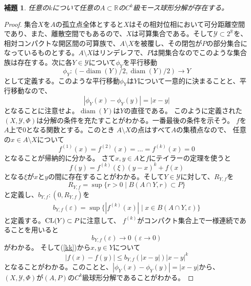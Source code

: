 \documentclass[leqno]{jsarticle}
\newtheorem{lem}[thm]{補題}
\newcommand{\rr}{\mathbb{R}}
\newcommand{\ep}{\varepsilon}
\newcommand{\cl}{\text{{\rm CL}}}
\DeclareMathOperator{\di}{diam}
\begin{document}
\begin{lem}\label{m1}
任意の$k$について任意の$A\subset \rr$の$C^k$級モース球形分解が存在する。
\end{lem}
\begin{proof}
集合$X$を$A$の孤立点全体とすると$X$はその相対位相において可分距離空間であり、また、離散空間でもあるので、$X$は可算集合である。そして$\mathcal{Y}\subset 2^{\rr}$を、相対コンパクトな開区間の可算族で、$A\setminus X$を被覆し、その閉包が$P$の部分集合になっているものとする。$A\setminus X$はリンデレフで、$P$は開集合なのでこのような集合族は存在する。次に各$Y\in \mathcal{Y}$について$\phi_Y$を平行移動
\[
\phi_Y:(-\di(Y)/2, \di(Y)/2)\to Y
\]
として定義する。このような平行移動$\phi_Y$は$Y$について一意的に決まることと、平行移動なので、
\[
|\phi_Y(x)-\phi_Y(y)|=|x-y|
\]
となることに注意せよ。$\di(Y)$は$Y$の直径である。
このように定義された$(X,\mathcal{Y}, \Phi)$は分解の条件を充たすことがわかる。一番最後の条件を示そう。
$f$を$A$上で$0$となる関数とする。このとき
$A\setminus X$の点はすべて$A$の集積点なので、
任意の$x\in A\setminus X$について
\[
f^{(1)}(x)=f^{(2)}(x)=\dots =f^{(k)}(x)=0
\]
となることが帰納的に分かる。
さて$x,y\in A$と$f$にテイラーの定理を使うと
\[
f(y)=f^{(k)}(\xi)(y-x)^k+f(x)
\]
となる$\xi$が$x$と$y$の間に存在することがわかる。そして$Y\in \mathcal{Y}$に対して、$R_{Y,f}$を
\[
R_{Y,f}=\sup\{r>0\mid B(A\cap Y, r)\subset P\}
\]
と定義し、$b_{Y,f}:(0,R_{Y,f})$を
\begin{align}\label{kk}
b_{Y,f}(\ep)=\sup\{|f^{(k)}(x)|\mid x\in B(A\cap Y,\ep)\}
\end{align}
と定義する。$\cl(Y)\subset P$に注意して、
$f^{(k)}$がコンパクト集合上で一様連続であることを用いると
\[
b_{Y,f}(\ep)\to 0 \ (\ep\to 0)
\]がわかる。
そして(\ref{kk})から$x,y\in Y$について
\[
|f(x)-f(y)|\le b_{Y,f}(|x-y|)|x-y|^k
\]
となることがわかる。このことと、$|\phi_Y(x)-\phi_Y(y)|=|x-y|$から、$(X,\mathcal{Y},\Phi)$が$(A,P)$の$C^k$級球形分解であることがわかる。
\end{proof}
\end{document}
